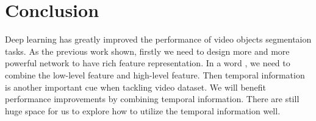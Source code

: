 \section{Conclusion}
Deep learning has greatly improved the performance of video objects segmentaion tasks. As the previous work shown, firstly we need to design more and more powerful network
to have rich feature representation. In a word , we need to combine the low-level feature and high-level feature. Then temporal information is another important
cue when tackling  video dataset. We will benefit performance improvements by combining temporal information. There are still huge space for us to explore how 
to utilize the temporal information well.